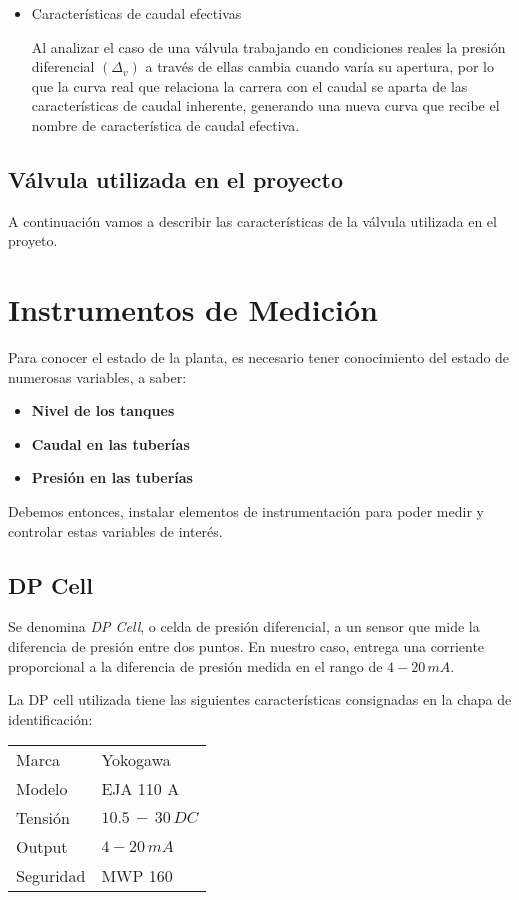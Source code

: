 \begin{itemize}
  \item Características de caudal efectivas
  
  Al analizar el caso de una válvula trabajando en condiciones reales la 
  presión diferencial ${(\Delta_v)}$ a través de ellas cambia cuando varía su
  apertura, por lo que la curva real que relaciona la carrera con el caudal
  se aparta de las características de caudal inherente, generando una nueva 
  curva que recibe el nombre de característica de caudal efectiva.
  
  
\end{itemize}

\subsection{Válvula utilizada en el proyecto}

A continuación vamos a describir las características de la válvula utilizada 
en el proyeto.


\section{Instrumentos de Medición}
\label{sec:InstrumentosMedicion}
Para conocer el estado de la planta, es necesario tener conocimiento del
estado de numerosas variables, a saber:
\begin{itemize}
 \item \textbf{Nivel de los tanques}
 \item \textbf{Caudal en las tuberías}
 \item \textbf{Presión en las tuberías}
\end{itemize}
Debemos entonces, instalar elementos de instrumentación para poder 
medir y controlar estas variables de interés.

\subsection{DP Cell}
\label{subsec:DPCell}
Se denomina \textit{DP Cell}, o celda de presión diferencial, a un sensor
que mide la diferencia de presión entre dos puntos.
En nuestro caso, entrega una corriente proporcional a la diferencia de presión 
medida en el rango de $4-20\,mA$.

La DP cell utilizada tiene las siguientes características consignadas en 
la chapa de identificación:

\begin{center}
\begin{tabular}{|l|l|}
\hline
Marca & Yokogawa\\
Modelo & EJA 110 A\\
Tensión & $10.5\,-\,30 \, DC$\\
Output & $4-20\,mA$\\
Seguridad & MWP 160\\
\hline
\end{tabular}
\end{center}


